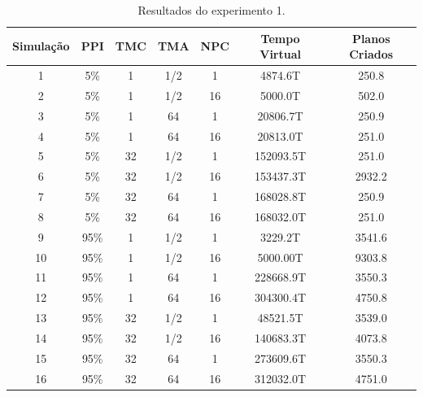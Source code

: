 \begin{table}[h!]
    \begin{center}
        \caption{ Resultados do experimento 1.}
        \label{table:experimento1}
        \begin{tabular}{ |c|c|c|c|c|c|c| }
            \hline
            \textbf{Simulação} & \textbf{PPI} & \textbf{TMC} & \textbf{TMA} & \textbf{NPC} & \textbf{Tempo Virtual} & \textbf{Planos Criados}\\
            \hline
            1 & 5\% & 1 & 1/2 & 1 & 4874.6T & 250.8\\
            \hline
            2 & 5\% & 1 & 1/2 & 16 & 5000.0T & 502.0\\
            \hline
            3 & 5\% & 1 & 64 & 1 & 20806.7T & 250.9\\
            \hline
            4 & 5\% & 1 & 64 & 16 & 20813.0T & 251.0\\
            \hline
            5 & 5\% & 32 & 1/2 & 1 & 152093.5T & 251.0\\
            \hline
            6 & 5\% & 32 & 1/2 & 16 & 153437.3T & 2932.2\\
            \hline
            7 & 5\% & 32 & 64 & 1 & 168028.8T & 250.9\\
            \hline
            8 & 5\% & 32 & 64 & 16 & 168032.0T & 251.0\\
            \hline
            9 & 95\% & 1 & 1/2 & 1 & 3229.2T & 3541.6\\
            \hline
            10 & 95\% & 1 & 1/2 & 16 & 5000.00T & 9303.8\\
            \hline
            11 & 95\% & 1 & 64 & 1 & 228668.9T & 3550.3\\
            \hline
            12 & 95\% & 1 & 64 & 16 & 304300.4T & 4750.8\\
            \hline
            13 & 95\% & 32 & 1/2 & 1 & 48521.5T & 3539.0\\
            \hline
            14 & 95\% & 32 & 1/2 & 16 & 140683.3T & 4073.8\\
            \hline
            15 & 95\% & 32 & 64 & 1 & 273609.6T & 3550.3\\
            \hline
            16 & 95\% & 32 & 64 & 16 & 312032.0T & 4751.0\\
            \hline
        \end{tabular}{}
    \end{center}{}
\end{table}

